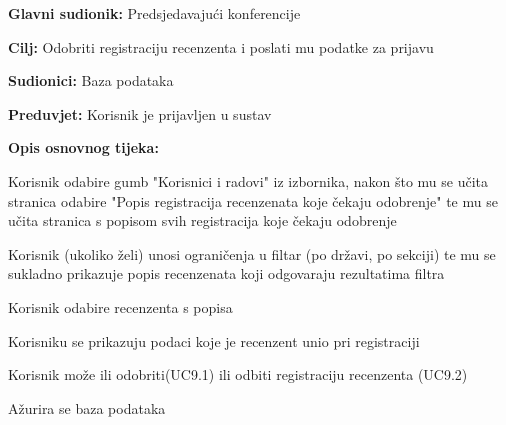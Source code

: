 					

				
					\noindent {}
					\begin{packed_item}
						
						\item \textbf{Glavni sudionik: } Predsjedavajući konferencije
						\item  \textbf{Cilj:} Odobriti registraciju recenzenta i poslati mu podatke za prijavu
						\item  \textbf{Sudionici:} Baza podataka
						\item  \textbf{Preduvjet:} Korisnik je prijavljen u sustav
						\item  \textbf{Opis osnovnog tijeka:}
						
						\item[] \begin{packed_enum}
							
							\item Korisnik odabire gumb "Korisnici i radovi" iz izbornika, nakon što mu se učita stranica odabire "Popis registracija recenzenata koje čekaju odobrenje" te mu se učita stranica s popisom svih registracija koje čekaju odobrenje
							\item Korisnik (ukoliko želi) unosi ograničenja u filtar (po državi, po sekciji) te mu se sukladno prikazuje popis recenzenata koji odgovaraju rezultatima filtra
							\item Korisnik odabire recenzenta s popisa
							\item Korisniku se prikazuju podaci koje je recenzent unio pri registraciji
							\item Korisnik može ili odobriti(UC9.1) ili odbiti registraciju recenzenta (UC9.2)
							\item Ažurira se baza podataka
							
							
						\end{packed_enum}
						
					\end{packed_item}
					
